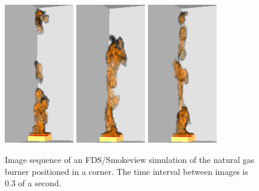 \documentclass[twoside]{uocthesis}
\begin{document}
{\begin{figure}[p]
	\includegraphics[width=1.2in]{../Figures/FDSNG_Corner7}
	\includegraphics[width=1.2in]{../Figures/FDSNG_Corner8}
	\includegraphics[width=1.2in]{../Figures/FDSNG_Corner9} \\
	
	\caption[Image sequence of an FDS/Smokeview simulation of the natural gas burner positioned in a corner.]{Image sequence of an FDS/Smokeview simulation of the natural gas burner positioned in a corner. The time interval between images is 0.3 of a second.}
	\label{FDS_Corner_Sequence}
\end{figure}

}
\end{document}
